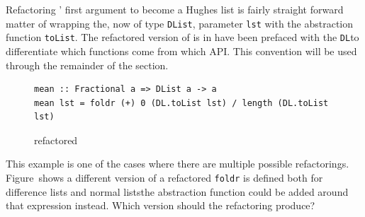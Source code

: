 Refactoring \texttt{\DIFdelbegin {}\DIFdelend \DIFaddbegin {}\DIFaddend }' \DIFdelbegin {}\DIFdelend first argument to become a Hughes list is fairly straight forward matter of wrapping the, now of type \texttt{DList}, parameter \texttt{lst} with the abstraction function \texttt{toList}. The refactored version of \texttt{\DIFdelbegin {}\DIFdelend \DIFaddbegin {}\DIFaddend } is in \DIFdelbegin {}\texttt{} %
\DIFdelend \DIFaddbegin {}\texttt{} \DIFaddend have been prefaced with the \DIFaddbegin {}\DIFaddend \texttt{DL}\DIFdelbegin {}\DIFdelend \DIFaddbegin {}\DIFaddend to differentiate which functions come from which API. This convention will be used through the remainder of the section. \DIFaddbegin {}\texttt{} \texttt{} \texttt{} \DIFaddend 

\begin{figure}[t]
\DIFdelbeginFL %
\DIFdelendFL \DIFaddbeginFL \begin{lstlisting}
mean :: Fractional a => DList a -> a
mean lst = foldr (+) 0 (DL.toList lst) / length (DL.toList lst)
\end{lstlisting}  
\DIFaddendFL \caption{\DIFdelbeginFL \texttt{} %
\DIFdelendFL \DIFaddbeginFL \texttt{} \DIFaddendFL refactored}
\DIFdelbeginFL %
\DIFdelendFL \DIFaddbeginFL \label{meanRef} 
\DIFaddendFL \end{figure}

This example is one of the cases where there are multiple possible refactorings. Figure~\DIFdelbegin \DIFdel{\ref{medianRef2} }\DIFdelend \DIFaddbegin \DIFadd{\ref{meanRef2} }\DIFaddend shows a different version of a refactored \DIFdelbegin {}\DIFdelend \DIFaddbegin \texttt{}\DIFaddend \texttt{foldr} is defined both for difference lists and normal lists\DIFaddbegin \DIFadd{, }\DIFaddend the abstraction function could be added around that expression instead. Which version should the refactoring produce?


